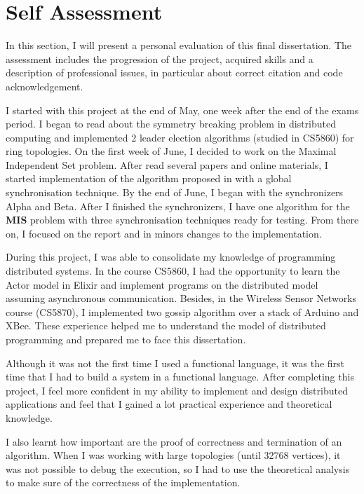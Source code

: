 \section{Self Assessment}
\label{chap:7}


In this section, I will present a personal evaluation of this final dissertation.  The assessment includes the progression of the project, acquired skills and a description of professional issues, in particular about correct citation and code acknowledgement.

I started with this project at the end of May, one week after the end of the exams period. I began to read about the symmetry breaking problem in distributed computing and implemented 2 leader election algorithms (studied in CS5860) for ring topologies. On the first week of June, I decided to work on the Maximal Independent Set problem. After read several papers and online materials, I started implementation of the algorithm proposed in \cite{yves2009optimal} with a global synchronisation technique. By the end of June, I began with the synchronizers Alpha and Beta. After I finished the synchronizers, I have one algorithm for the \textbf{MIS} problem with three synchronisation techniques ready for testing. From there on, I focused on the report and in minors changes to the implementation.

During this project, I was able to consolidate my knowledge of programming distributed systems. In the course CS5860, I had the opportunity to learn the Actor model in Elixir and implement programs on the distributed model assuming asynchronous communication. Besides, in the Wireless Sensor Networks course (CS5870), I implemented two gossip algorithm over a stack of Arduino and XBee. These experience helped me to understand the model of distributed programming and prepared me to face this dissertation.

Although it was not the first time I used a functional language, it was the first time that I had to build a system in a functional language. After completing this project, I feel more confident in my ability to implement and design distributed applications and feel that I gained a lot practical experience and theoretical knowledge.   

I also learnt how important are the proof of correctness and termination of an algorithm. When I was working with large topologies  (until 32768 vertices), it was not possible to debug the execution, so I had to use the theoretical analysis to make sure of the correctness of the implementation. 

